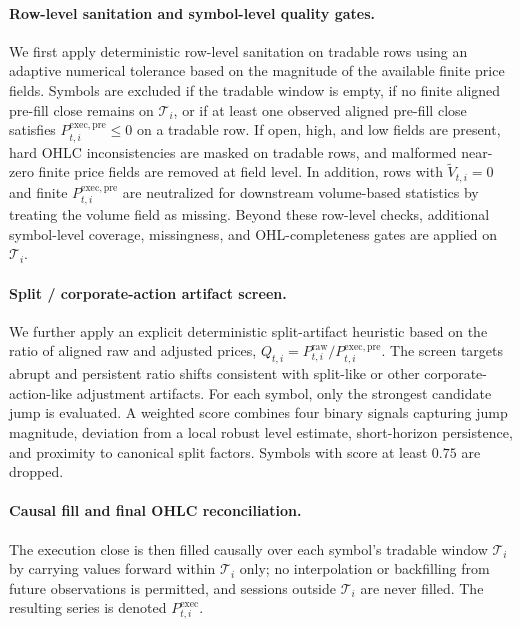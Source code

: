 \documentclass[11pt,a4paper]{article}
\begin{document}
\paragraph{Row-level sanitation and symbol-level quality gates.}
We first apply deterministic row-level sanitation on tradable rows using an
adaptive numerical tolerance based on the magnitude of the available finite
price fields. Symbols are excluded if the tradable window is empty, if no
finite aligned pre-fill close remains on \(\mathcal{T}_i\), or if at least one
observed aligned pre-fill close satisfies
\(
P^{\mathrm{exec,pre}}_{t,i}\le 0
\)
on a tradable row. If open, high, and low fields are present, hard OHLC
inconsistencies are masked on tradable rows, and malformed near-zero finite
price fields are removed at field level. In addition, rows with
\(\widetilde V_{t,i}=0\) and finite \(P^{\mathrm{exec,pre}}_{t,i}\) are
neutralized for downstream volume-based statistics by treating the volume field
as missing. Beyond these row-level checks, additional symbol-level coverage,
missingness, and OHL-completeness gates are applied on \(\mathcal{T}_i\).

\paragraph{Split / corporate-action artifact screen.}
We further apply an explicit deterministic split-artifact heuristic based on
the ratio of aligned raw and adjusted prices,
\(
Q_{t,i}=P^{\mathrm{raw}}_{t,i}/P^{\mathrm{exec,pre}}_{t,i}.
\)
The screen targets abrupt and persistent ratio shifts consistent with
split-like or other corporate-action-like adjustment artifacts. For each
symbol, only the strongest candidate jump is evaluated. A weighted score
combines four binary signals capturing jump magnitude, deviation from a local
robust level estimate, short-horizon persistence, and proximity to canonical
split factors. Symbols with score at least \(0.75\) are dropped.

\paragraph{Causal fill and final OHLC reconciliation.}
The execution close is then filled causally over each symbol's tradable window
\(\mathcal{T}_i\) by carrying values forward within \(\mathcal{T}_i\) only; no
interpolation or backfilling from future observations is permitted, and
sessions outside \(\mathcal{T}_i\) are never filled. The resulting series is
denoted \(P^{\mathrm{exec}}_{t,i}\).
\end{document}
